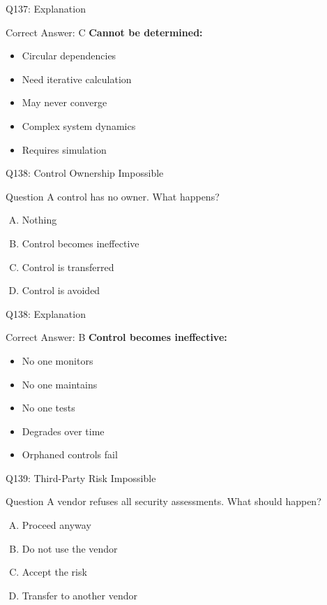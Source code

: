 \documentclass{beamer}
\begin{document}
	\begin{frame}{Q137: Explanation}
		\begin{block}{Correct Answer: C}
			\textbf{Cannot be determined:}
			\begin{itemize}
				\item Circular dependencies
				\item Need iterative calculation
				\item May never converge
				\item Complex system dynamics
				\item Requires simulation
			\end{itemize}
		\end{block}
	\end{frame}
	
	\begin{frame}{Q138: Control Ownership Impossible}
		\begin{block}{Question}
			A control has no owner. What happens?
		\end{block}
		\begin{enumerate}[(A)]
			\item Nothing
			\item Control becomes ineffective
			\item Control is transferred
			\item Control is avoided
		\end{enumerate}
	\end{frame}
	
	\begin{frame}{Q138: Explanation}
		\begin{block}{Correct Answer: B}
			\textbf{Control becomes ineffective:}
			\begin{itemize}
				\item No one monitors
				\item No one maintains
				\item No one tests
				\item Degrades over time
				\item Orphaned controls fail
			\end{itemize}
		\end{block}
	\end{frame}
	
	\begin{frame}{Q139: Third-Party Risk Impossible}
		\begin{block}{Question}
			A vendor refuses all security assessments. What should happen?
		\end{block}
		\begin{enumerate}[(A)]
			\item Proceed anyway
			\item Do not use the vendor
			\item Accept the risk
			\item Transfer to another vendor
		\end{enumerate}
	\end{frame}
	
\end{document}

